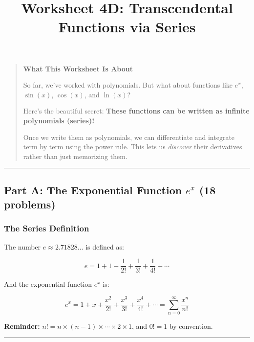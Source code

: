 \documentclass[
  11pt,
]{article}
\title{Worksheet 4D: Transcendental Functions via Series}
\author{}
\date{}
\begin{document}
\maketitle

\begin{quote}
\textbf{What This Worksheet Is About}

So far, we've worked with polynomials. But what about functions like
\(e^x\), \(\sin(x)\), \(\cos(x)\), and \(\ln(x)\)?

Here's the beautiful secret: \textbf{These functions can be written as
infinite polynomials (series)!}

Once we write them as polynomials, we can differentiate and integrate
term by term using the power rule. This lets us \emph{discover} their
derivatives rather than just memorizing them.
\end{quote}

\begin{center}\rule{0.5\linewidth}{0.5pt}\end{center}

\hypertarget{part-a-the-exponential-function-ex-18-problems}{%
\subsection{\texorpdfstring{Part A: The Exponential Function \(e^x\) (18
problems)}{Part A: The Exponential Function e\^{}x (18 problems)}}\label{part-a-the-exponential-function-ex-18-problems}}

\hypertarget{the-series-definition}{%
\subsubsection{The Series Definition}\label{the-series-definition}}

The number \(e \approx 2.71828...\) is defined as:

\[e = 1 + 1 + \frac{1}{2!} + \frac{1}{3!} + \frac{1}{4!} + \cdots\]

And the exponential function \(e^x\) is:

\[\boxed{e^x = 1 + x + \frac{x^2}{2!} + \frac{x^3}{3!} + \frac{x^4}{4!} + \cdots = \sum_{n=0}^{\infty} \frac{x^n}{n!}}\]

\textbf{Reminder:}
\(n! = n \times (n-1) \times \cdots \times 2 \times 1\), and \(0! = 1\)
by convention.

\begin{center}\rule{0.5\linewidth}{0.5pt}\end{center}
\end{document}
